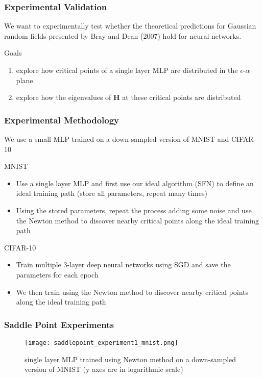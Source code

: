 \documentclass{beamer}
\begin{document}
\begin{frame}
\frametitle{Experimental Validation}
\pause
We want to experimentally test whether the theoretical predictions for Gaussian random fields presented by Bray and Dean (2007) hold for neural networks.
\pause
\vspace{0.2in}
\begin{block}{Goals}
\begin{enumerate}
\pause
\item{explore how critical points of a single layer MLP are distributed in the $\epsilon$-$\alpha$ plane}
\vspace{0.05in}
\pause
\item{explore how the eigenvalues of $\bm{H}$ at these critical points are distributed}
\end{enumerate}
\end{block}

\end{frame}

\begin{frame}
\frametitle{Experimental Methodology}
\pause
We use a small MLP trained on a down-sampled version of MNIST and CIFAR-10
\pause
\begin{block}{MNIST}
\begin{itemize}
\item{Use a single layer MLP and first use our ideal algorithm (SFN) to define an ideal training path (store all parameters, repeat many times)}
\item{Using the stored parameters, repeat the process adding some noise and use the Newton method to discover nearby critical points along the ideal training path}
\end{itemize}
\end{block}

\vspace{-0.1in}
\pause
\begin{block}{CIFAR-10}
\begin{itemize}
\item{Train multiple 3-layer deep neural networks using SGD and save the parameters for each epoch}
\item{We then train using the Newton method to discover nearby critical points along the ideal training path}
\end{itemize}
\end{block}
\end{frame}


\begin{frame}
\frametitle{Saddle Point Experiments}
\vspace{0.05in}
\begin{figure}
\center
\texttt{[image: saddlepoint\_experiment1\_mnist.png]}
\caption{single layer MLP trained using Newton method on a down-sampled version of MNIST (y axes are in logarithmic scale)}
\end{figure}
\end{frame}
\end{document}
